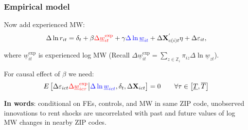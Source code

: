 \documentclass[aspectratio=169]{beamer}
\begin{document}
\begin{frame}
	\frametitle{Empirical model}
		
	Now add experienced MW:
	$$
	\Delta \ln r_{it} = \delta_t +
	    \beta {\color{red}\Delta \underline{w}^{\text{exp}}_{it}} +
		\gamma {\color{blue} \Delta \ln \underline{w}_{it}} + 
		\Delta \mathbf{X}^{'}_{c(i)t} \eta + 
		\Delta \varepsilon_{it} ,
	$$
	
	where $\underline{w}^{\text{exp}}_{it}$ is experienced log MW {\small (Recall 
	$\Delta \underline{w}^{\text{exp}}_{it} = \sum_{z \in \mathbb{Z}_i} \pi_{i z} \Delta 
	\ln \underline{w}_{zt}$)}.

	\pause
	\vspace{2mm}
	For causal effect of $\beta$ we need:
	$$
	E \left[\Delta \varepsilon_{ict} {\color{red} \Delta 
	\underline{w}^{\text{exp}}_{ic\tau}} 
	\big| {\color{blue}\Delta \ln \underline{w}_{ict}}, \delta_t, \Delta 
	\mathbf{X}_{ict} \right] = 0
	\quad \quad \forall \tau \in \left[ \underline{T}, \overline{T} \right]
	$$
	
	\pause
	\vspace{2mm}
	\textbf{In words}: conditional on FEs, controls, and {\color{blue} MW in same ZIP 
	code}, unobserved innovations to rent shocks are uncorrelated with past and future 
	values of log MW changes {\color{red} in nearby ZIP codes}.
\end{frame}
\end{document}
